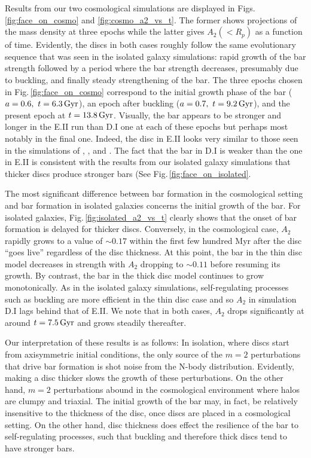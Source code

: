 Results from our two cosmological simulations are displayed in
Figs.\,\ref{fig:face_on_cosmo} and \ref{fig:cosmo_a2_vs_t}.  The
former shows projections of the mass density at three epochs while the
latter gives $A_2(<R_p)$ as a function of time.  Evidently, the discs
in both cases roughly follow the same evolutionary sequence that was seen in
the isolated galaxy simulations: rapid growth of the bar strength
followed by a period where the bar strength decreases,
presumably due to buckling, and finally steady strengthening of the
bar.  The three epochs chosen in Fig.\,\ref{fig:face_on_cosmo}
correspond to the initial growth phase of the bar
($a=0.6,~t=6.3\,{\rm Gyr}$), an epoch after buckling
($a=0.7,~t = 9.2\,{\rm Gyr}$), and the present epoch at
$t=13.8\,{\rm Gyr}$.  Visually, the bar appears to be stronger and
longer in the E.II run than D.I one at each of these epochs but
perhaps most notably in the final one.  Indeed, the disc in E.II looks
very similar to those seen in the simulations of
\citet{DeBuhrStellarDisks}, \citet{YurinSpringelStellarDisks}, and
\citet{Bauer2018a}.  The fact that the bar in D.I is weaker than the
one in E.II is consistent with the results from our isolated galaxy
simulations that thicker discs produce stronger bars (See
Fig.\,\ref{fig:face_on_isolated}.

The most significant difference between bar formation in the
cosmological setting and bar formation in isolated galaxies concerns
the initial growth of the bar.  For isolated galaxies,
Fig.\,\ref{fig:isolated_a2_vs_t} clearly shows that the onset of bar
formation is delayed for thicker discs.  Conversely, in the
cosmological case, $A_2$ rapidly grows to a value of $\sim 0.17$
within the first few hundred Myr after the disc ``goes live''
regardless of the disc thickness.  At this point, the bar in the thin
disc model decreases in strength with $A_2$ dropping to $\sim 0.11$
before resuming its growth.  By contrast, the bar in the thick disc
model continues to grow monotonically.  As in the isolated galaxy
simulations, self-regulating processes such as buckling are more
efficient in the thin disc case and so $A_2$ in simulation D.I lags
behind that of E.II.  We note that in both cases, $A_2$ drops
significantly at around $t=7.5\,{\rm Gyr}$ and grows steadily
thereafter.

Our interpretation of these results is as follows: In isolation, where
discs start from axisymmetric initial conditions, the only source of
the $m=2$ perturbations that drive bar formation is shot noise from
the N-body distribution.  Evidently, making a disc thicker slows the
growth of these perturbations.  On the other hand, $m=2$ perturbations
abound in the cosmological environment where halos are clumpy and
triaxial.  The initial growth of the bar may, in fact, be relatively
insensitive to the thickness of the disc, once discs are placed in a
cosmological setting.  On the other hand, disc thickness does effect
the resilience of the bar to self-regulating processes, such that
buckling and therefore thick discs tend to have stronger bars.


